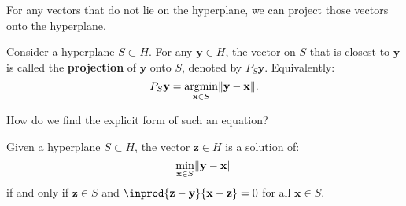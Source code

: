 \documentclass{huhtakm-template-book-v2}
\DeclareMathOperator*{\argmin}{argmin}
\begin{document}
    For any vectors that do not lie on the hyperplane, we can project those vectors onto the hyperplane.
    \begin{defn}
        Consider a hyperplane $S \subset H$. For any $\mathbf{y} \in H$, the vector on $S$ that is closest to $\mathbf{y}$ is called the \textbf{projection} of $\mathbf{y}$ onto $S$, denoted by $P_{S}\mathbf{y}$. Equivalently:
        \begin{equation*}
            P_{S}\mathbf{y} = \argmin_{\mathbf{x} \in S}\norm{\mathbf{y} - \mathbf{x}}.
        \end{equation*} 
    \end{defn}
    How do we find the explicit form of such an equation?
    \begin{thm}
        \label{Chapter 4 (Theorem) Criteria for Projection Vector}
        Given a hyperplane $S \subset H$, the vector $\mathbf{z} \in H$ is a solution of:
        \begin{equation*}
            \min_{\mathbf{x} \in S}\lVert{\mathbf{y}-\mathbf{x}}\rVert
        \end{equation*}
        if and only if $\mathbf{z} \in S$ and $\inprod{\mathbf{z}-\mathbf{y}}{\mathbf{x}-\mathbf{z}}=0$ for all $\mathbf{x} \in S$.
    \end{thm}
\end{document}

